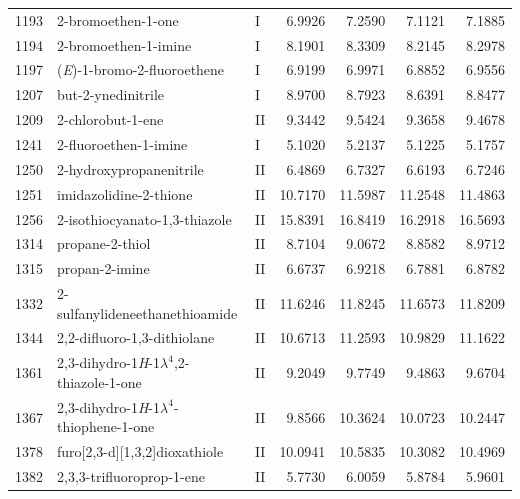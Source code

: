 \begin{longtable}{rlld{2.5}d{2.5}d{2.5}d{2.5}}
    1193 & 2-bromoethen-1-one                                     & I  & 6.9926  & 7.2590  & 7.1121  & 7.1885  \\
    1194 & 2-bromoethen-1-imine                                   & I  & 8.1901  & 8.3309  & 8.2145  & 8.2978  \\
    1197 & (\textit{E})-1-bromo-2-fluoroethene                    & I  & 6.9199  & 6.9971  & 6.8852  & 6.9556  \\
    1207 & but-2-ynedinitrile                                     & I  & 8.9700  & 8.7923  & 8.6391  & 8.8477  \\
    1209 & 2-chlorobut-1-ene                                      & II & 9.3442  & 9.5424  & 9.3658  & 9.4678  \\
    1241 & 2-fluoroethen-1-imine                                  & I  & 5.1020  & 5.2137  & 5.1225  & 5.1757  \\
    1250 & 2-hydroxypropanenitrile                                & II & 6.4869  & 6.7327  & 6.6193  & 6.7246  \\
    1251 & imidazolidine-2-thione                                 & II & 10.7170 & 11.5987 & 11.2548 & 11.4863 \\
    1256 & 2-isothiocyanato-1,3-thiazole                          & II & 15.8391 & 16.8419 & 16.2918 & 16.5693 \\
    1314 & propane-2-thiol                                        & II & 8.7104  & 9.0672  & 8.8582  & 8.9712  \\
    1315 & propan-2-imine                                         & II & 6.6737  & 6.9218  & 6.7881  & 6.8782  \\
    1332 & 2-sulfanylideneethanethioamide                         & II & 11.6246 & 11.8245 & 11.6573 & 11.8209 \\
    1344 & 2,2-difluoro-1,3-dithiolane                            & II & 10.6713 & 11.2593 & 10.9829 & 11.1622 \\
    1361 & 2,3-dihydro-1\textit{H}-1$\lambda^4$,2-thiazole-1-one  & II & 9.2049  & 9.7749  & 9.4863  & 9.6704  \\
    1367 & 2,3-dihydro-1\textit{H}-1$\lambda^4$-thiophene-1-one   & II & 9.8566  & 10.3624 & 10.0723 & 10.2447 \\
    1378 & furo[2,3-d][1,3,2]dioxathiole                          & II & 10.0941 & 10.5835 & 10.3082 & 10.4969 \\
    1382 & 2,3,3-trifluoroprop-1-ene                              & II & 5.7730  & 6.0059  & 5.8784  & 5.9601  \\

\end{longtable}
